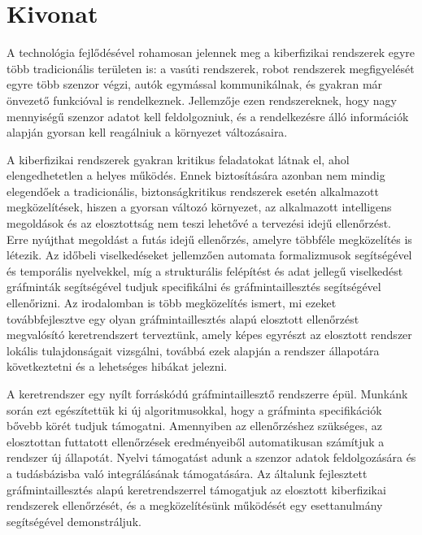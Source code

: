 \setcounter{page}{1}

\selecthungarian

\chapter*{Kivonat}

A technológia fejlődésével rohamosan jelennek meg a kiberfizikai rendszerek egyre több tradicionális területen is: a vasúti rendszerek, robot rendszerek megfigyelését egyre több szenzor végzi, autók egymással kommunikálnak, és gyakran már önvezető funkcióval is rendelkeznek. Jellemzője ezen rendszereknek, hogy nagy mennyiségű szenzor adatot kell feldolgozniuk, és a rendelkezésre álló információk alapján gyorsan kell reagálniuk a környezet változásaira.

A kiberfizikai rendszerek gyakran kritikus feladatokat látnak el, ahol elengedhetetlen a helyes működés. Ennek biztosítására azonban nem mindig elegendőek a tradicionális, biztonságkritikus rendszerek esetén alkalmazott megközelítések, hiszen a gyorsan változó környezet, az alkalmazott intelligens megoldások és az elosztottság nem teszi lehetővé a tervezési idejű ellenőrzést. Erre nyújthat megoldást a futás idejű ellenőrzés, amelyre többféle megközelítés is létezik. Az időbeli viselkedéseket jellemzően automata formalizmusok segítségével és temporális nyelvekkel, míg a strukturális felépítést és adat jellegű viselkedést gráfminták segítségével tudjuk specifikálni és gráfmintaillesztés segítségével ellenőrizni. Az irodalomban is több megközelítés ismert, mi ezeket továbbfejlesztve egy olyan gráfmintaillesztés alapú elosztott ellenőrzést megvalósító keretrendszert terveztünk, amely képes egyrészt az elosztott rendszer lokális tulajdonságait vizsgálni, továbbá ezek alapján a rendszer állapotára következtetni és a lehetséges hibákat jelezni.

A keretrendszer egy nyílt forráskódú gráfmintaillesztő rendszerre épül. Munkánk során ezt egészítettük ki új algoritmusokkal, hogy a gráfminta specifikációk bővebb körét tudjuk támogatni. Amennyiben az ellenőrzéshez szükséges, az elosztottan futtatott ellenőrzések eredményeiből automatikusan számítjuk a rendszer új állapotát. Nyelvi támogatást adunk a szenzor adatok feldolgozására és a tudásbázisba való integrálásának támogatására. Az általunk fejlesztett gráfmintaillesztés alapú keretrendszerrel támogatjuk az elosztott kiberfizikai rendszerek ellenőrzését, és a megközelítésünk működését egy esettanulmány segítségével demonstráljuk.



